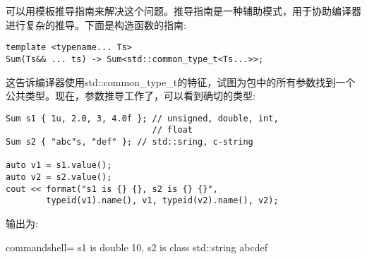 可以用模板推导指南来解决这个问题。推导指南是一种辅助模式，用于协助编译器进行复杂的推导。下面是构造函数的指南:

\begin{lstlisting}[style=styleCXX]
template <typename... Ts>
Sum(Ts&& ... ts) -> Sum<std::common_type_t<Ts...>>;
\end{lstlisting}

这告诉编译器使用std::common\_type\_t的特征，试图为包中的所有参数找到一个公共类型。现在，参数推导工作了，可以看到确切的类型:

\begin{lstlisting}[style=styleCXX]
Sum s1 { 1u, 2.0, 3, 4.0f }; // unsigned, double, int,
							 // float
Sum s2 { "abc"s, "def" }; // std::sring, c-string

auto v1 = s1.value();
auto v2 = s2.value();
cout << format("s1 is {} {}, s2 is {} {}",
		typeid(v1).name(), v1, typeid(v2).name(), v2);
\end{lstlisting}

输出为:

\begin{tcblisting}{commandshell={}}
s1 is double 10, s2 is class std::string abcdef
\end{tcblisting}



